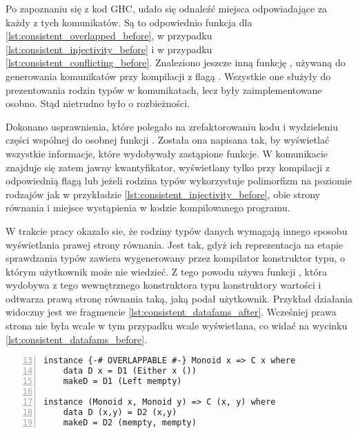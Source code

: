 Po zapoznaniu się z kod GHC, udało się odnaleźć miejsca odpowiadające za każdy z tych komunikatów. Są to odpowiednio funkcja  dla \ref{lst:consistent_overlapped_before},  w przypadku \ref{lst:consistent_injectivity_before} i  w przypadku \ref{lst:consistent_conflicting_before}. Znaleziono jeszcze inną funkcję , używaną do generowania komunikatów przy kompilacji z flagą . Wszystkie one służyły do prezentowania rodzin typów w komunikatach, lecz były zaimplementowane osobno. Stąd nietrudno było o rozbieżności.

Dokonano usprawnienia, które polegało na zrefaktorowaniu kodu i wydzieleniu części wspólnej do osobnej funkcji . Została ona napisana tak, by wyświetlać wszystkie informacje, które wydobywały zastąpione funkcje. W komunikacie znajduje się zatem jawny kwantyfikator, wyświetlany tylko przy kompilacji z odpowiednią flagą lub jeżeli rodzina typów wykorzystuje polimorfizm na poziomie rodzajów jak w przykładzie \ref{lst:consistent_injectivity_before}, obie strony równania i miejsce wystąpienia w kodzie kompilowanego programu.

W trakcie pracy okazało sie, że rodziny typów danych wymagają innego sposobu wyświetlania prawej strony równania. Jest tak, gdyż ich reprezentacja na etapie sprawdzania typów zawiera wygenerowany przez kompilator konstruktor typu, o którym użytkownik może nie wiedzieć. Z tego powodu  używa funkcji , która wydobywa z tego wewnętrznego konstruktora typu konstruktory wartości i odtwarza prawą stronę równania taką, jaką podał użytkownik. Przykład działania widoczny jest we fragmencie \ref{lst:consistent_datafams_after}. Wcześniej prawa strona nie była wcale w tym przypadku wcale wyświetlana, co widać na wycinku \ref{lst:consistent_datafams_before}.

\begin{lstlisting}[numbers=left,firstnumber=13,label={lst:consistent_datafams_code},
                   caption={Fragment testu T9371 z rodziną typów danych powiązaną z klasą \code{C} i równaniami o nachodzących na siebie dziedzinach.}]
instance {-# OVERLAPPABLE #-} Monoid x => C x where
    data D x = D1 (Either x ())
    makeD = D1 (Left mempty)

instance (Monoid x, Monoid y) => C (x, y) where
    data D (x,y) = D2 (x,y)
    makeD = D2 (mempty, mempty)
\end{lstlisting}

